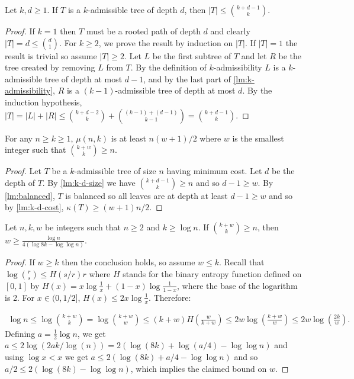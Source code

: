 \documentclass[unicode,review]{siamart1116}
\numberwithin{theorem}{section}
\begin{document}
\begin{lemma}
\label{lm:k-d-size}
Let $k,d \geq 1$. If $T$ is a $k$-admissible tree of depth $d$,
then $|T| \leq \binom{k + d - 1}{k}$.
\end{lemma}
\begin{proof}
If $k=1$ then $T$ must be a rooted path of depth $d$ and clearly $|T|=d\le \binom{d}{1}$. 
For $k\ge 2$, we prove the result by induction on $|T|$.  If $|T|=1$ the result is trivial so
assume $|T| \geq 2$.  Let $L$ be the first subtree of $T$ and let $R$ be the tree created by removing $L$ from $T$. By the definition of $k$-admissibility
$L$ is a $k$-admissible tree of depth at most $d-1$, and by the last part of
\cref{lm:k-admissibility}, $R$ is a $(k-1)$-admissible tree of depth at most $d$.
By the induction hypothesis, $|T| = |L| + |R| \leq \binom{k + d - 2}{k} + \binom{(k-1) + (d - 1)}{k - 1} = \binom{k + d - 1}{k}$.
\end{proof}





\begin{corollary}
\label{cor:mu}
For any $n \geq k \geq 1$, $\mu(n,k)$ is at least $n(w+1)/2$ 
where $w$ is the smallest integer such that $\binom{k+w}{k} \geq n$.
\end{corollary}

\begin{proof}
Let $T$ be a $k$-admissible tree of size $n$ having minimum cost.  Let $d$ be the depth of $T$.
By \cref{lm:k-d-size} we have
$\binom{k+d-1}{k} \geq n$ and so $d-1 \geq w$.
By \cref{lm:balanced}, $T$ is balanced so all leaves are at depth at least $d-1\geq w$ and so
by \cref{lm:k-d-cost}, $\kappa(T) \geq (w+1)n/2$.  
\end{proof}

\begin{lemma} \label{lm:lower_bound_d}
Let $n,k,w$ be integers such that $n\ge 2$ and $k \ge \log n$.  If $\binom{k+w}{k} \geq n$,
then $w \ge \frac{\log n}{ 4 (\log 8k - \log\log n)}$.
\end{lemma}
\begin{proof}
If $w \geq k$ then the conclusion holds, so assume $w \leq k$.
Recall that $\log\binom{r}{s} \leq {H(s/r) r}$
where $H$ stands for the binary entropy function
defined on $[0,1]$ by $H(x) = x \log\frac{1}{x} + (1-x) \log\frac{1}{1-x}$, where the base of the logarithm is 2.
For $x \in (0,1/2]$, $H(x) \le 2x \log\frac{1}{x}$. Therefore:
	
\begin{align*}
	\log n \leq \log{\binom{k+w}{k}} 
	= \log {\binom{k+w}{w}}
	\leq (k+w)H\left(\frac{w}{k + w}\right)
	\leq 2w\log\left(\frac{k + w}{w}\right)
	\leq 2w\log\left(\frac{2k}{w}\right).
\end{align*}
Defining $a=\frac{1}{2}\log n$, we get $a \leq 2\log(2ak/\log(n))=2(\log(8k)+\log(a/4)-\log\log n)$
and using $\log x<x$ we get $a \leq 2(\log(8k)+a/4 -\log\log n)$ and so $a/2 \leq 2(\log(8k)-\log\log n)$, which
implies the claimed bound on $w$.
\end{proof}
\end{document}
